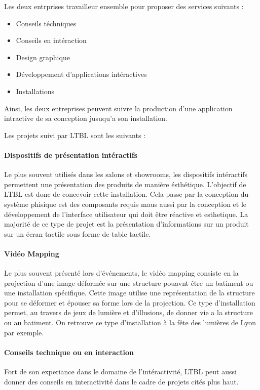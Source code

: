 \documentclass{article}
\begin{document}
Les deux entrprises travailleur ensemble pour proposer des services suivants :

\begin{itemize}
    \item Conseils téchniques
    \item Conseils en intéraction
    \item Design graphique
    \item Développement d'applications intéractives
    \item Installations
\end{itemize}

Ainsi, les deux entreprises peuvent suivre la production d'une application intractive de sa conception jusuqu'a son installation.

\medskip

Les projets suivi par LTBL sont les suivants :

\paragraph{Dispositifs de présentation intéractifs} Le plus souvent utilisés dans les salons et showrooms, les dispositifs intéractifs permettent une présentation des produits de manière ésthétique.
L'objectif de LTBL est donc de concevoir cette installation.
Cela passe par la conception du système phisique est des composants requis maus aussi par la conception et le développement de l'interface utilisateur qui doit être réactive et esthetique.
La majorité de ce type de projet est la présentation d'informations sur un produit sur un écran tactile sous forme de table tactile.

\paragraph{Vidéo Mapping} Le plus souvent présenté lors d'événements, le vidéo mapping consiste en la projection d'une image déformée sur une structure pouavnt être un batiment ou une installation spécifique.
Cette image utilise une représentation de la structure pour se déformer et épouser sa forme lors de la projection.
Ce type d'installation permet, au travers de jeux de lumière et d'illusions, de donner vie a la structure ou au batiment.
On retrouve ce type d'installation à la fête des lumières de Lyon par exemple.

\paragraph{Conseils technique ou en interaction} Fort de son experiance dans le domaine de l'intéractivité, LTBL peut aussi donner des conseils en interactivité dans le cadre de projets cités plus haut.
\end{document}
